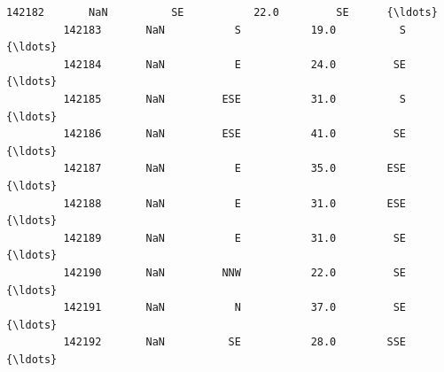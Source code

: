 \documentclass[11pt]{article}
\begin{document}
\begin{Verbatim}[commandchars=\\\{\}]
         142182       NaN          SE           22.0         SE      {\ldots}        
         142183       NaN           S           19.0          S      {\ldots}        
         142184       NaN           E           24.0         SE      {\ldots}        
         142185       NaN         ESE           31.0          S      {\ldots}        
         142186       NaN         ESE           41.0         SE      {\ldots}        
         142187       NaN           E           35.0        ESE      {\ldots}        
         142188       NaN           E           31.0        ESE      {\ldots}        
         142189       NaN           E           31.0         SE      {\ldots}        
         142190       NaN         NNW           22.0         SE      {\ldots}        
         142191       NaN           N           37.0         SE      {\ldots}        
         142192       NaN          SE           28.0        SSE      {\ldots}        
         

\end{Verbatim}
\end{document}
